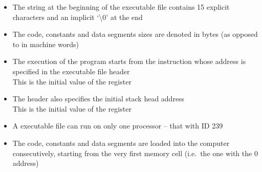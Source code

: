 \begin{itemize}
    \item The  string at the beginning of the executable file contains
    15 explicit characters and an implicit `\textbackslash 0' at the end

    \item The code, constants and data segments sizes are denoted in bytes
    (as opposed to in machine words)

    \item The execution of the program starts from the instruction whose address
    is specified in the executable file header \\
    This is the initial value of the  register

    \item The header also specifies the initial stack head address \\
    This is the initial value of the  register

    \item A  executable file can run on only one processor
    -- that with ID 239

    \item The code, constants and data segments are loaded into the 
    computer consecutively, starting from the very first memory cell
    (i.e.\ the one with the 0 address)
\end{itemize}
